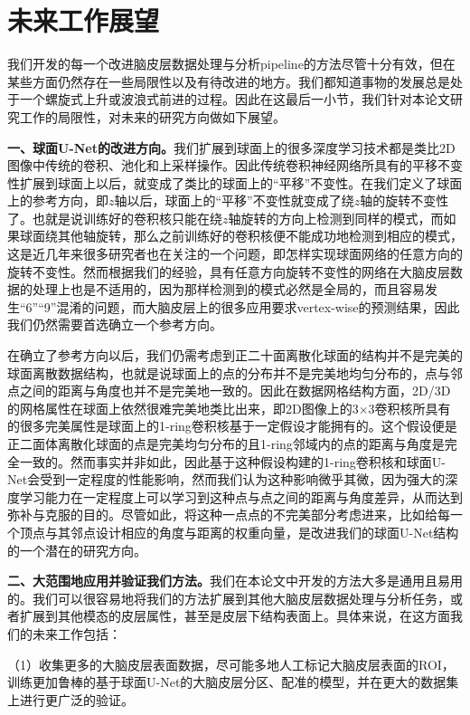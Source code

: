 \section{未来工作展望}
我们开发的每一个改进脑皮层数据处理与分析pipeline的方法尽管十分有效，但在某些方面仍然存在一些局限性以及有待改进的地方。我们都知道事物的发展总是处于一个螺旋式上升或波浪式前进的过程。因此在这最后一小节，我们针对本论文研究工作的局限性，对未来的研究方向做如下展望。

\textbf{一、球面U-Net的改进方向。}我们扩展到球面上的很多深度学习技术都是类比2D图像中传统的卷积、池化和上采样操作。因此传统卷积神经网络所具有的平移不变性扩展到球面上以后，就变成了类比的球面上的“平移”不变性。在我们定义了球面上的参考方向，即$z$轴以后，球面上的“平移”不变性就变成了绕$z$轴的旋转不变性了。也就是说训练好的卷积核只能在绕$z$轴旋转的方向上检测到同样的模式，而如果球面绕其他轴旋转，那么之前训练好的卷积核便不能成功地检测到相应的模式，这是近几年来很多研究者也在关注的一个问题\cite{esteves2018learning,cohen2018spherical,cohen2019gauge}，即怎样实现球面网络的任意方向的旋转不变性。然而根据我们的经验，具有任意方向旋转不变性的网络在大脑皮层数据的处理上也是不适用的，因为那样检测到的模式必然是全局的，而且容易发生“6”“9”混淆的问题，而大脑皮层上的很多应用要求vertex-wise的预测结果，因此我们仍然需要首选确立一个参考方向。

在确立了参考方向以后，我们仍需考虑到正二十面离散化球面的结构并不是完美的球面离散数据结构，也就是说球面上的点的分布并不是完美地均匀分布的，点与邻点之间的距离与角度也并不是完美地一致的。因此在数据网格结构方面，2D/3D的网格属性在球面上依然很难完美地类比出来，即2D图像上的3$\times$3卷积核所具有的很多完美属性是球面上的1-ring卷积核基于一定假设才能拥有的。这个假设便是正二面体离散化球面的点是完美均匀分布的且1-ring邻域内的点的距离与角度是完全一致的。然而事实并非如此，因此基于这种假设构建的1-ring卷积核和球面U-Net会受到一定程度的性能影响，然而我们认为这种影响微乎其微，因为强大的深度学习能力在一定程度上可以学习到这种点与点之间的距离与角度差异，从而达到弥补与克服的目的。尽管如此，将这种一点点的不完美部分考虑进来，比如给每一个顶点与其邻点设计相应的角度与距离的权重向量，是改进我们的球面U-Net结构的一个潜在的研究方向。

\textbf{二、大范围地应用并验证我们方法。}我们在本论文中开发的方法大多是通用且易用的。我们可以很容易地将我们的方法扩展到其他大脑皮层数据处理与分析任务，或者扩展到其他模态的皮层属性，甚至是皮层下结构表面上。具体来说，在这方面我们的未来工作包括：

（1）收集更多的大脑皮层表面数据，尽可能多地人工标记大脑皮层表面的ROI，训练更加鲁棒的基于球面U-Net的大脑皮层分区、配准的模型，并在更大的数据集上进行更广泛的验证。

